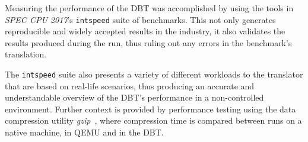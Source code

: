 
\begin{comment}
\begin{figure}[h]
	\centering
	\begin{tikzpicture}
		\begin{axis}[%
			title = {Example bar graph},
			ybar,
			area legend,
			ylabel = {Value in some unit},
			xtick = data,
			xtick style = {draw = none},
			ytick = {0, 2500, 5000, 7500, 10000, 12500},
			scaled y ticks = false,
			symbolic x coords={First category, Second category, Third category},
			ymin = 0, ymax = 12500,
			ymajorgrids = true,
			height = 6.0cm,
			width = \linewidth,
			legend style = {
				at = {(0.5, -0.25)},
				anchor = north,
				legend columns = 3,
				column sep = 0.2cm
			}
		]	
			\addplot+ [
				fill=era-dbt-1,
				draw=black
			] coordinates {
				(First category, 3061)
				(Second category, 10930)
				(Third category, 10971)
			};
			
			\addplot+ [
				fill=era-qemu,
				draw=black
			] coordinates {
				(First category, 3061)
				(Second category, 9092)
				(Third category, 5042)
			};
			
			\addplot+ [
				fill=era-native,
				draw=black
			] coordinates {
				(First category, 4043)
				(Second category, 6092)
				(Third category, 7971)
			};

			
			\legend{First series, Second series, Third series}
		\end{axis}
	\end{tikzpicture}
	\caption{I am an example figure. If you're reading the submitted document, someone forgot to remove me.}
\end{figure}
\end{comment}


Measuring the performance of the DBT was accomplished by using the tools in \textit{SPEC CPU 2017}'s \texttt{intspeed} suite of benchmarks.
This not only generates reproducible and widely accepted results in the industry, it also validates the results produced during the run, thus ruling out any errors in the benchmark's translation.

The \texttt{intspeed} suite also presents a variety of different workloads to the translator that are based on real-life scenarios, thus producing an accurate and understandable overview of the DBT's performance in a non-controlled environment.
Further context is provided by performance testing using the data compression utility \textit{gzip}~\cite{gzip}, where compression time is compared between runs on a native machine, in QEMU and in the DBT.

